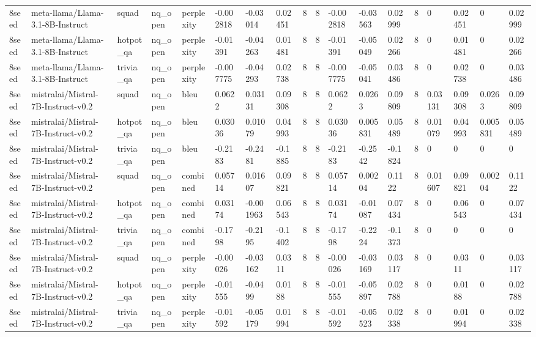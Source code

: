 \begin{tabular}{llllllllllllllllll}
8seed & meta-llama/Llama-3.1-8B-Instruct & squad & nq\_open & perplexity & -0.002818 & -0.03014 & 0.02451 & 8 & 8 & -0.002818 & -0.03563 & 0.02999 & 8 & 0 & 0.02451 & 0 & 0.02999 \\
8seed & meta-llama/Llama-3.1-8B-Instruct & hotpot\_qa & nq\_open & perplexity & -0.01391 & -0.04263 & 0.01481 & 8 & 8 & -0.01391 & -0.05049 & 0.02266 & 8 & 0 & 0.01481 & 0 & 0.02266 \\
8seed & meta-llama/Llama-3.1-8B-Instruct & trivia\_qa & nq\_open & perplexity & -0.007775 & -0.04293 & 0.02738 & 8 & 8 & -0.007775 & -0.05041 & 0.03486 & 8 & 0 & 0.02738 & 0 & 0.03486 \\
8seed & mistralai/Mistral-7B-Instruct-v0.2 & squad & nq\_open & bleu & 0.0622 & 0.03131 & 0.09308 & 8 & 8 & 0.0622 & 0.0263 & 0.09809 & 8 & 0.03131 & 0.09308 & 0.0263 & 0.09809 \\
8seed & mistralai/Mistral-7B-Instruct-v0.2 & hotpot\_qa & nq\_open & bleu & 0.03036 & 0.01079 & 0.04993 & 8 & 8 & 0.03036 & 0.005831 & 0.05489 & 8 & 0.01079 & 0.04993 & 0.005831 & 0.05489 \\
8seed & mistralai/Mistral-7B-Instruct-v0.2 & trivia\_qa & nq\_open & bleu & -0.2183 & -0.2481 & -0.1885 & 8 & 8 & -0.2183 & -0.2542 & -0.1824 & 8 & 0 & 0 & 0 & 0 \\
8seed & mistralai/Mistral-7B-Instruct-v0.2 & squad & nq\_open & combined & 0.05714 & 0.01607 & 0.09821 & 8 & 8 & 0.05714 & 0.00204 & 0.1122 & 8 & 0.01607 & 0.09821 & 0.00204 & 0.1122 \\
8seed & mistralai/Mistral-7B-Instruct-v0.2 & hotpot\_qa & nq\_open & combined & 0.03174 & -0.001963 & 0.06543 & 8 & 8 & 0.03174 & -0.01087 & 0.07434 & 8 & 0 & 0.06543 & 0 & 0.07434 \\
8seed & mistralai/Mistral-7B-Instruct-v0.2 & trivia\_qa & nq\_open & combined & -0.1798 & -0.2195 & -0.1402 & 8 & 8 & -0.1798 & -0.2224 & -0.1373 & 8 & 0 & 0 & 0 & 0 \\
8seed & mistralai/Mistral-7B-Instruct-v0.2 & squad & nq\_open & perplexity & -0.00026 & -0.03162 & 0.0311 & 8 & 8 & -0.00026 & -0.03169 & 0.03117 & 8 & 0 & 0.0311 & 0 & 0.03117 \\
8seed & mistralai/Mistral-7B-Instruct-v0.2 & hotpot\_qa & nq\_open & perplexity & -0.01555 & -0.0499 & 0.0188 & 8 & 8 & -0.01555 & -0.05897 & 0.02788 & 8 & 0 & 0.0188 & 0 & 0.02788 \\
8seed & mistralai/Mistral-7B-Instruct-v0.2 & trivia\_qa & nq\_open & perplexity & -0.01592 & -0.05179 & 0.01994 & 8 & 8 & -0.01592 & -0.05523 & 0.02338 & 8 & 0 & 0.01994 & 0 & 0.02338 \\
\bottomrule
\end{tabular}
